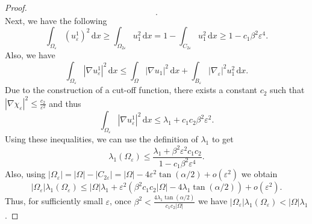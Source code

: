 \begin{proof}
\[  .\] 
  Next, we have the following
  \[
  \int_{ \Omega_{\varepsilon}} \! (u_{\varepsilon}^{1})^{2} \, \mathrm{d}x \geq \int_{ \Omega_{2 \varepsilon}} \! u_{1}^{2} \, \mathrm{d}x = 1 - \int_{ C_{2 \varepsilon}} \! u_{1}^{2} \, \mathrm{d}x \geq 1 - c_{1}\beta^{2}\varepsilon^{4}
  .\] 
  Also, we have
  \[
  \int_{ \Omega_{\varepsilon}} \! | \nabla u_{\varepsilon}^{1} |^{2} \, \mathrm{d}x \leq \int_{ \Omega} \! | \nabla u_{1} |^{2} \, \mathrm{d}x  + \int_{ B_{\varepsilon}} \! | \nabla_{\varepsilon} |^{2} u_{1}^{2} \, \mathrm{d}x 
  .\] 
  Due to the construction of a cut-off function, there exists a constant $c_{2}$ such that $| \nabla \chi_{\varepsilon} |^{2} \leq \frac{c_{2}}{\varepsilon^{2}}$ and thus
  \[
  \int_{ \Omega_{\varepsilon}} \! | \nabla u_{\varepsilon}^{1} |^{2} \, \mathrm{d}x \leq  \lambda_{1} + c_{1}c_{2} \beta^{2} \varepsilon^{2}
  .\] 
  Using these inequalities, we can use the definition of $\lambda_{1}$ to get
  \[
  \lambda_{1}(\Omega_{\varepsilon}) \leq \frac{\lambda_{1} + \beta^{2}\varepsilon^{2}c_{1}c_{2}}{1 - c_{1}\beta^{2}\varepsilon^{4}}
  .\] 
  Also, using $| \Omega_{\varepsilon} | = | \Omega | - | C_{2 \varepsilon} | = | \Omega | - 4 \varepsilon^{2} \tan (\alpha / 2) + o(\varepsilon^{2})$ we obtain
  \[
  | \Omega_{\varepsilon} |\lambda_{1}(\Omega_{\varepsilon}) \leq | \Omega |\lambda_{1} + \varepsilon^{2} \left( \beta^{2} c_{1}c_{2}| \Omega | - 4 \lambda_{1}\tan (\alpha / 2) \right ) + o(\varepsilon^{2})
  .\] 
  Thus, for sufficiently small $\varepsilon$, once $\beta^{2} < \frac{4 \lambda_{1}\tan(\alpha / 2)}{c_{1}c_{2}| \Omega |}$ we have $| \Omega_{\varepsilon}|\lambda_{1}(\Omega_{\varepsilon}) < | \Omega |\lambda_{1}$.
\end{proof}

